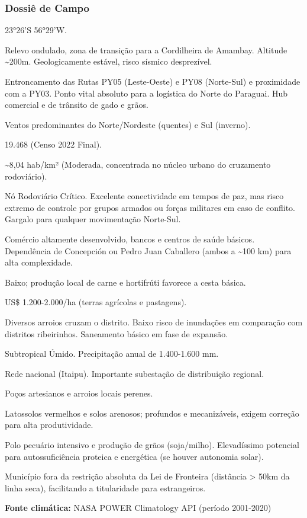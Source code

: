 \subsubsection{Dossiê de Campo}
\begin{description}[style=nextline,leftmargin=0.5cm,font=\bfseries]
\item[Coordenadas]  23°26'S 56°29'W.
\item[Topografia]  Relevo ondulado, zona de transição para a Cordilheira de Amambay. Altitude \textasciitilde 200m. Geologicamente estável, risco sísmico desprezível.
\item[Alvos Estratégicos]  Entroncamento das Rutas PY05 (Leste-Oeste) e PY08 (Norte-Sul) e proximidade com a PY03. Ponto vital absoluto para a logística do Norte do Paraguai. Hub comercial e de trânsito de gado e grãos.
\item[Fallout]  Ventos predominantes do Norte/\allowbreak Nordeste (quentes) e Sul (inverno).
\item[População]  19.468 (Censo 2022 Final).
\item[Densidade]  \textasciitilde 8,04 hab/\allowbreak km² (Moderada, concentrada no núcleo urbano do cruzamento rodoviário).
\item[Vias de Acesso]  Nó Rodoviário Crítico. Excelente conectividade em tempos de paz, mas risco extremo de controle por grupos armados ou forças militares em caso de conflito. Gargalo para qualquer movimentação Norte-Sul.
\item[Serviços]  Comércio altamente desenvolvido, bancos e centros de saúde básicos. Dependência de Concepción ou Pedro Juan Caballero (ambos a \textasciitilde 100 km) para alta complexidade.
\item[Custo de Vida]  Baixo; produção local de carne e hortifrúti favorece a cesta básica.
\item[Preço da Terra]  US\$ 1.200-2.000/\allowbreak ha (terras agrícolas e pastagens).
\item[Hidrologia]  Diversos arroios cruzam o distrito. Baixo risco de inundações em comparação com distritos ribeirinhos. Saneamento básico em fase de expansão.
\item[Clima]  Subtropical Úmido. Precipitação anual de 1.400-1.600 mm.
\item[Energia]  Rede nacional (Itaipu). Importante subestação de distribuição regional.
\item[Água]  Poços artesianos e arroios locais perenes.
\item[Qualidade do Solo]  Latossolos vermelhos e solos arenosos; profundos e mecanizáveis, exigem correção para alta produtividade.
\item[Recursos Locais]  Polo pecuário intensivo e produção de grãos (soja/\allowbreak milho). Elevadíssimo potencial para autossuficiência proteica e energética (se houver autonomia solar).
\item[Leis Local]  Município fora da restrição absoluta da Lei de Fronteira (distância > 50km da linha seca), facilitando a titularidade para estrangeiros.
\end{description}
\textbf{Fonte climática:} NASA POWER Climatology API (período 2001-2020)

